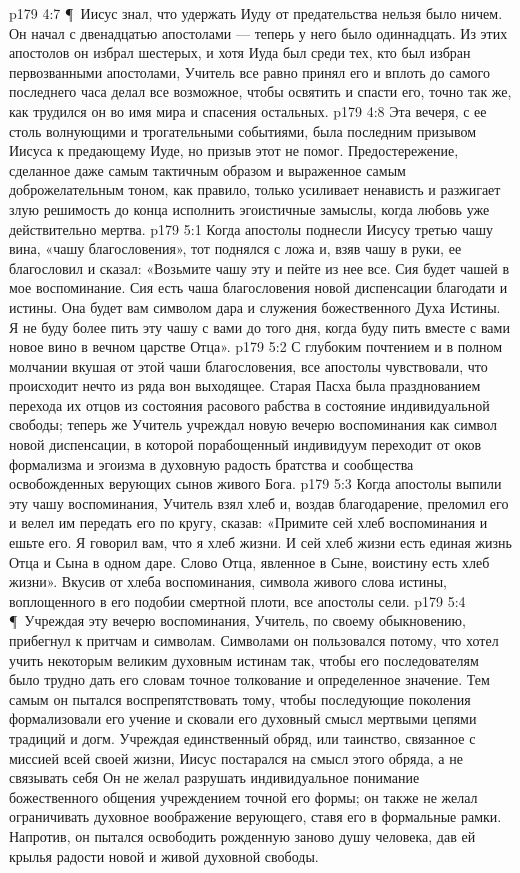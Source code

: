 \vs p179 4:7 \P\ Иисус знал, что удержать Иуду от предательства нельзя было ничем. Он начал с двенадцатью апостолами --- теперь у него было одиннадцать. Из этих апостолов он избрал шестерых, и хотя Иуда был среди тех, кто был избран первозванными апостолами, Учитель все равно принял его и вплоть до самого последнего часа делал все возможное, чтобы освятить и спасти его, точно так же, как трудился он во имя мира и спасения остальных.
\vs p179 4:8 Эта вечеря, с ее столь волнующими и трогательными событиями, была последним призывом Иисуса к предающему Иуде, но призыв этот не помог. Предостережение, сделанное даже самым тактичным образом и выраженное самым доброжелательным тоном, как правило, только усиливает ненависть и разжигает злую решимость до конца исполнить эгоистичные замыслы, когда любовь уже действительно мертва.
\vs p179 5:1 Когда апостолы поднесли Иисусу третью чашу вина, «чашу благословения», тот поднялся с ложа и, взяв чашу в руки, ее благословил и сказал: «Возьмите чашу эту и пейте из нее все. Сия будет чашей в мое воспоминание. Сия есть чаша благословения новой диспенсации благодати и истины. Она будет вам символом дара и служения божественного Духа Истины. Я не буду более пить эту чашу с вами до того дня, когда буду пить вместе с вами новое вино в вечном царстве Отца».
\vs p179 5:2 С глубоким почтением и в полном молчании вкушая от этой чаши благословения, все апостолы чувствовали, что происходит нечто из ряда вон выходящее. Старая Пасха была празднованием перехода их отцов из состояния расового рабства в состояние индивидуальной свободы; теперь же Учитель учреждал новую вечерю воспоминания как символ новой диспенсации, в которой порабощенный индивидуум переходит от оков формализма и эгоизма в духовную радость братства и сообщества освобожденных верующих сынов живого Бога.
\vs p179 5:3 Когда апостолы выпили эту чашу воспоминания, Учитель взял хлеб и, воздав благодарение, преломил его и велел им передать его по кругу, сказав: «Примите сей хлеб воспоминания и ешьте его. Я говорил вам, что я хлеб жизни. И сей хлеб жизни есть единая жизнь Отца и Сына в одном даре. Слово Отца, явленное в Сыне, воистину есть хлеб жизни». Вкусив от хлеба воспоминания, символа живого слова истины, воплощенного в его подобии смертной плоти, все апостолы сели.
\vs p179 5:4 \P\ Учреждая эту вечерю воспоминания, Учитель, по своему обыкновению, прибегнул к притчам и символам. Символами он пользовался потому, что хотел учить некоторым великим духовным истинам так, чтобы его последователям было трудно дать его словам точное толкование и определенное значение. Тем самым он пытался воспрепятствовать тому, чтобы последующие поколения формализовали его учение и сковали его духовный смысл мертвыми цепями традиций и догм. Учреждая единственный обряд, или таинство, связанное с миссией всей своей жизни, Иисус постарался  на смысл этого обряда, а не связывать себя  Он не желал разрушать индивидуальное понимание божественного общения учреждением точной его формы; он также не желал ограничивать духовное воображение верующего, ставя его в формальные рамки. Напротив, он пытался освободить рожденную заново душу человека, дав ей крылья радости новой и живой духовной свободы.
